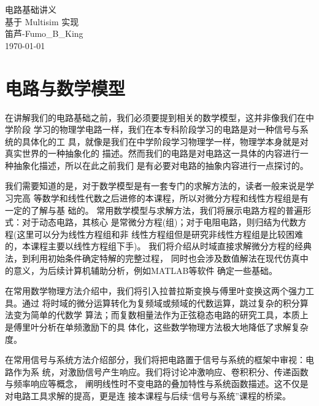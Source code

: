 \documentclass{article}
\numberwithin{figure}{subsection} %
\begin{document}
\begin{titlepage}
    \centering
    {\Huge 电路基础讲义 \\[1cm]}
    {\Large 基于 Multisim 实现 \\[2cm]}
    {\Large 笛芦-Fumo\_B\_King \\[1cm]}
    {\large \today}
\end{titlepage}


\tableofcontents        %
\setcounter{page}{1}
\newpage                %

\setcounter{page}{1}
\section{电路与数学模型}

    在讲解我们的电路基础之前，我们必须要提到相关的数学模型，这并非像我们在中学阶段
    学习的物理学电路一样，我们在本专科阶段学习的电路是对一种信号与系统的具体化的工
    具，就像是我们在中学阶段学习物理学一样，物理学本身就是对真实世界的一种抽象化的
    描述。然而我们的电路是对电路这一具体的内容进行一种抽象化描述，所以在此之前我们
    是有必要对电路的抽象内容进行一点探讨的。

    我们需要知道的是，对于数学模型是有一套专门的求解方法的，读者一般来说是学习完高
    等数学和线性代数之后进修的本课程，所以对微分方程和线性方程组是有一定的了解与基
    础的。
    常用数学模型与求解方法，我们将展示电路方程的普遍形式：对于动态电路，其核心
    是常微分方程(组)；对于电阻电路，则归结为代数方程(这里可以分为线性方程组和非
    线性方程组但是研究非线性方程组是比较困难的，本课程主要以线性方程组下手)。
    我们将介绍从时域直接求解微分方程的经典法，到利用初始条件确定特解的完整过程，
    同时也会涉及数值解法在现代仿真中的意义，为后续计算机辅助分析，例如MATLAB等软件
    确定一些基础。

    在常用数学物理方法介绍中，我们将引入拉普拉斯变换与傅里叶变换这两个强力工具。通过
    将时域的微分运算转化为复频域或频域的代数运算，跳过复杂的积分算法变为简单的代数学
    算法；而复数相量法作为正弦稳态电路的研究工具，本质上是傅里叶分析在单频激励下的具
    体化，这些数学物理方法极大地降低了求解复杂度。

    在常用信号与系统方法介绍部分，我们将把电路置于信号与系统的框架中审视：电路作为系
    统，对激励信号产生响应。我们将讨论冲激响应、卷积积分、传递函数与频率响应等概念，
    阐明线性时不变电路的叠加特性与系统函数描述。这不仅是对电路工具求解的提高，更是连
    接本课程与后续“信号与系统”课程的桥梁。


    \newpage
\end{document}
